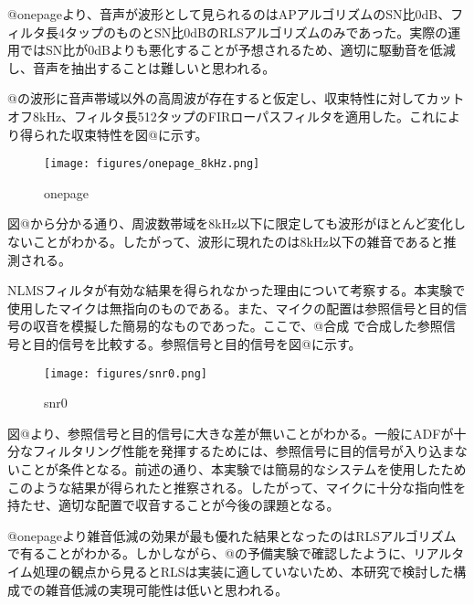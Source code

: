 @onepageより、音声が波形として見られるのはAPアルゴリズムのSN比0dB、フィルタ長4タップのものとSN比0dBのRLSアルゴリズムのみであった。実際の運用ではSN比が0dBよりも悪化することが予想されるため、適切に駆動音を低減し、音声を抽出することは難しいと思われる。

@の波形に音声帯域以外の高周波が存在すると仮定し、収束特性に対してカットオフ8kHz、フィルタ長512タップのFIRローパスフィルタを適用した。これにより得られた収束特性を図@に示す。

\begin{figure}
\centering
\texttt{[image: figures/onepage\_8kHz.png]}
\caption{onepage}
\end{figure}

図@から分かる通り、周波数帯域を8kHz以下に限定しても波形がほとんど変化しないことがわかる。したがって、波形に現れたのは8kHz以下の雑音であると推測される。

NLMSフィルタが有効な結果を得られなかった理由について考察する。本実験で使用したマイクは無指向のものである。また、マイクの配置は参照信号と目的信号の収音を模擬した簡易的なものであった。ここで、@合成
で合成した参照信号と目的信号を比較する。参照信号と目的信号を図@に示す。

\begin{figure}
\centering
\texttt{[image: figures/snr0.png]}
\caption{snr0}
\end{figure}

図@より、参照信号と目的信号に大きな差が無いことがわかる。一般にADFが十分なフィルタリング性能を発揮するためには、参照信号に目的信号が入り込まないことが条件となる。前述の通り、本実験では簡易的なシステムを使用したためこのような結果が得られたと推察される。したがって、マイクに十分な指向性を持たせ、適切な配置で収音することが今後の課題となる。

@onepageより雑音低減の効果が最も優れた結果となったのはRLSアルゴリズムで有ることがわかる。しかしながら、@の予備実験で確認したように、リアルタイム処理の観点から見るとRLSは実装に適していないため、本研究で検討した構成での雑音低減の実現可能性は低いと思われる。
